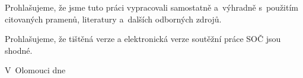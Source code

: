 \noindent
Prohlašujeme, že jsme tuto práci vypracovali samostatně a~výhradně
s~použitím citovaných pramenů, literatury a~dalších odborných zdrojů.

Prohlašujeme, že tištěná verze a elektronická verze soutěžní práce SOČ jsou
shodné.

\vspace{20mm}
\noindent
V~Olomouci dne \makebox[2.5cm]{\dotfill}
\hspace*{\fill}
\makebox[5cm]{\dotfill}
\hspace*{\fill}
\\
\\
\\
\makebox[5.55cm]{}
\hspace*{\fill}
\makebox[5cm]{\dotfill}
\hspace*{\fill}



